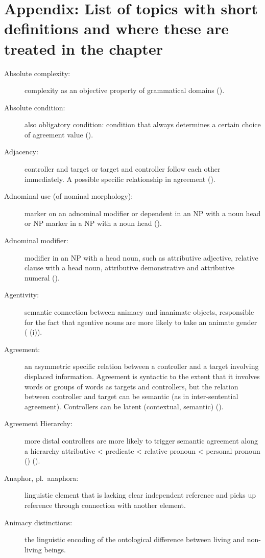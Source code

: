 \documentclass[output=collectionpaper]{langsci/langscibook}
\begin{document}
\section*{Appendix: List of topics with short definitions and where these are treated in the chapter}
\label{WDG:appendix}
{\sloppy%
\begin{description}
\item [Absolute complexity:] complexity as an objective property of grammatical domains ().
\item [Absolute condition:] also obligatory condition: condition that always determines a certain choice of agreement value ().
\item  [Adjacency:] controller and target or target and controller follow each other immediately. A possible specific relationship in agreement ().
\item  [Adnominal use (of nominal morphology):] marker on an adnominal modifier or dependent in an NP with a noun head or NP marker in a NP with a noun head ().
\item  [Adnominal modifier:] modifier in an NP with a head noun, such as attributive adjective, relative clause with a head noun, attributive demonstrative and attributive numeral ().
\item  [Agentivity:] semantic connection between animacy and inanimate objects, responsible for the fact that agentive nouns are more likely to take an animate gender ( (i)).
\item  [Agreement:] an asymmetric specific relation between a controller and a target involving displaced information. Agreement is syntactic to the extent that it involves words or groups of words as targets and controllers, but the relation between controller and target can be semantic (as in inter-sentential agreement). Controllers can be latent (contextual, semantic) ().
%
\item  [Agreement Hierarchy:] more distal controllers are more likely to trigger semantic agreement along a hierarchy attributive < predicate < relative pronoun < personal pronoun (\citealt[226]{Corbett1991}) ().
\item  [Anaphor, {\normalfont pl.}\ anaphora:] linguistic element that is lacking clear independent reference and picks up reference through connection with another element.
\item  [Animacy distinctions:] the linguistic encoding of the ontological difference between living and non-living beings.

\end{description}}
\end{document}

